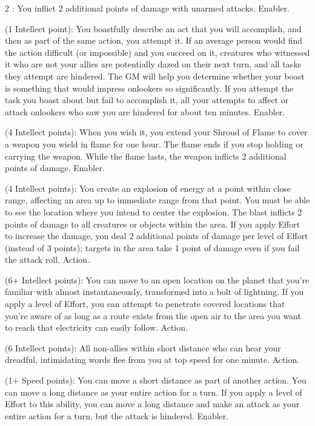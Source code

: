 \begin{multicols}{2}
: You inflict 2 additional points of damage with unarmed attacks. Enabler. 
 
 (1 Intellect point): You boastfully describe an act that you will accomplish, and then as part of the same action, you attempt it. If an average person would find the action difficult (or impossible) and you succeed on it, creatures who witnessed it who are not your allies are potentially dazed on their next turn, and all tasks they attempt are hindered. The GM will help you determine whether your boast is something that would impress onlookers so significantly. If you attempt the task you boast about but fail to accomplish it, all your attempts to affect or attack onlookers who saw you are hindered for about ten minutes. Enabler. 
 
 (4 Intellect points): When you wish it, you extend your Shroud of Flame to cover a weapon you wield in flame for one hour. The flame ends if you stop holding or carrying the weapon. While the flame lasts, the weapon inflicts 2 additional points of damage. Enabler. 
 
 (4 Intellect points): You create an explosion of energy at a point within close range, affecting an area up to immediate range from that point. You must be able to see the location where you intend to center the explosion. The blast inflicts 2 points of damage to all creatures or objects within the area. If you apply Effort to increase the damage, you deal 2 additional points of damage per level of Effort (instead of 3 points); targets in the area take 1 point of damage even if you fail the attack roll. Action. 
 
 (6+ Intellect points): You can move to an open location on the planet that you’re familiar with almost instantaneously, transformed into a bolt of lightning. If you apply a level of Effort, you can attempt to penetrate covered locations that you’re aware of as long as a route exists from the open air to the area you want to reach that electricity can easily follow. Action. 
 
 (6 Intellect points): All non-allies within short distance who can hear your dreadful, intimidating words flee from you at top speed for one minute. Action.
 
 (1+ Speed points): You can move a short distance as part of another action. You can move a long distance as your entire action for a turn. If you apply a level of Effort to this ability, you can move a long distance and make an attack as your entire action for a turn, but the attack is hindered. Enabler. 
 

\end{multicols}
